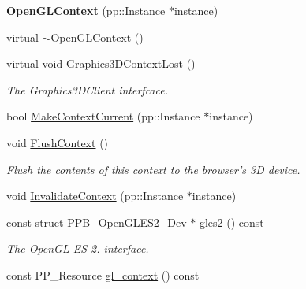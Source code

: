 \begin{DoxyCompactItemize}
\item 
\hypertarget{classtumbler_1_1_open_g_l_context_adbceb4281e000b791117f4d7815f1cb1}{{\bfseries Open\+G\+L\+Context} (pp\+::\+Instance $\ast$instance)}\label{classtumbler_1_1_open_g_l_context_adbceb4281e000b791117f4d7815f1cb1}

\item 
virtual \hyperlink{classtumbler_1_1_open_g_l_context_a98cae8e74a6dc3dba178e876c22f2382}{$\sim$\+Open\+G\+L\+Context} ()
\item 
\hypertarget{classtumbler_1_1_open_g_l_context_a4f1ca8cd78e8e025e3f7dd9f4a1feac7}{virtual void \hyperlink{classtumbler_1_1_open_g_l_context_a4f1ca8cd78e8e025e3f7dd9f4a1feac7}{Graphics3\+D\+Context\+Lost} ()}\label{classtumbler_1_1_open_g_l_context_a4f1ca8cd78e8e025e3f7dd9f4a1feac7}

\begin{DoxyCompactList}\small\item\em The Graphics3\+D\+Client interfcace. \end{DoxyCompactList}\item 
bool \hyperlink{classtumbler_1_1_open_g_l_context_ad94822712a009d51019160e42645e439}{Make\+Context\+Current} (pp\+::\+Instance $\ast$instance)
\item 
\hypertarget{classtumbler_1_1_open_g_l_context_af4ef5e027e46c5e559a793541e76377d}{void \hyperlink{classtumbler_1_1_open_g_l_context_af4ef5e027e46c5e559a793541e76377d}{Flush\+Context} ()}\label{classtumbler_1_1_open_g_l_context_af4ef5e027e46c5e559a793541e76377d}

\begin{DoxyCompactList}\small\item\em Flush the contents of this context to the browser's 3\+D device. \end{DoxyCompactList}\item 
void \hyperlink{classtumbler_1_1_open_g_l_context_a5f9beaa1bb551de52b5ce713c8216a1a}{Invalidate\+Context} (pp\+::\+Instance $\ast$instance)
\item 
\hypertarget{classtumbler_1_1_open_g_l_context_a4e18a0935ad4401aa837e43c0f97b6d1}{const struct P\+P\+B\+\_\+\+Open\+G\+L\+E\+S2\+\_\+\+Dev $\ast$ \hyperlink{classtumbler_1_1_open_g_l_context_a4e18a0935ad4401aa837e43c0f97b6d1}{gles2} () const }\label{classtumbler_1_1_open_g_l_context_a4e18a0935ad4401aa837e43c0f97b6d1}

\begin{DoxyCompactList}\small\item\em The Open\+G\+L E\+S 2. interface. \end{DoxyCompactList}\item 
\hypertarget{classtumbler_1_1_open_g_l_context_a1933dbdfa15cfe633a463c4b3379faf3}{const P\+P\+\_\+\+Resource \hyperlink{classtumbler_1_1_open_g_l_context_a1933dbdfa15cfe633a463c4b3379faf3}{gl\+\_\+context} () const }\label{classtumbler_1_1_open_g_l_context_a1933dbdfa15cfe633a463c4b3379faf3}


\end{DoxyCompactItemize}
